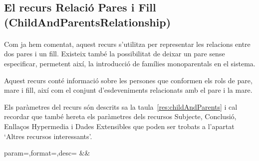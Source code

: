 \subsection{El recurs Relació Pares i Fill (ChildAndParentsRelationship)}

    \paragraph{}
    Com ja hem comentat, aquest recurs s'utilitza per representar les relacions entre dos pares i un fill. Existeix també la possibilitat de deixar un pare sense especificar, permetent així, la introducció de famílies monoparentals en el sistema.

    Aquest recurs conté informació sobre les persones que conformen els rols de pare, mare i fill, així com el conjunt d'esdeveniments relacionats amb el pare i la mare.

    Els paràmetres del recurs són descrits sa la taula~\ref{res:childAndParents} i cal recordar que també hereta els paràmetres dels recursos Subjecte, Conclusió, Enllaços Hypermedia i Dades Extensibles que poden ser trobats a l'apartat `Altres recursos interessants'.

    \begin{center}
             {param=\param,format=\format,desc=\desc}
             {\param&\format&\desc}
     \end{center}
